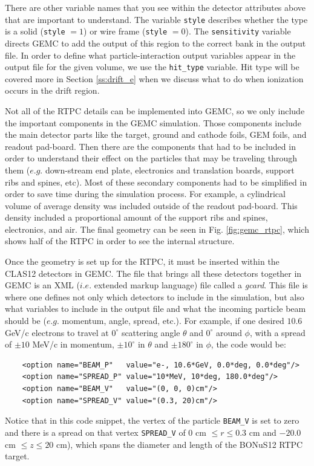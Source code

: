 There are other variable names that you see within the detector attributes above that are important to understand. The variable \lstinline|style| describes whether the type is a solid (\lstinline|style| $= 1$) or wire frame (\lstinline|style| $= 0$). The \lstinline|sensitivity| variable directs GEMC to add the output of this region to the correct bank in the output file. In order to define what particle-interaction output variables appear in the output file for the given volume, we use the \lstinline|hit_type| variable. Hit type will be covered more in Section \ref{ss:drift_e} when we discuss what to do when ionization occurs in the drift region.

Not all of the RTPC details can be implemented into GEMC, so we only include the important components in the GEMC simulation. Those components include the main detector parts like the target, ground and cathode foils, GEM foils, and readout pad-board. Then there are the components that had to be included in order to understand their effect on the particles that may be traveling through them ($e.g.$ down-stream end plate, electronics and translation boards, support ribs and spines, etc). Most of these secondary components had to be simplified in order to save time during the simulation process. For example, a cylindrical volume of average density was included outside of the readout pad-board. This density included a proportional amount of the support ribs and spines, electronics, and air. The final geometry can be seen in Fig. \ref{fig:gemc_rtpc}, which shows half of the RTPC in order to see the internal structure. 

Once the geometry is set up for the RTPC, it must be inserted within the CLAS12 detectors in GEMC. The file that brings all these detectors together in GEMC is an XML ($i.e.$ extended markup language) file called a \textit{gcard}. This file is where one defines not only which detectors to include in the simulation, but also what variables to include in the output file and what the incoming particle beam should be ($e.g.$ momentum, angle, spread, etc.). For example, if one desired $10.6$ GeV/c electrons to travel at $0^{\circ}$ scattering angle $\theta$ and $0^{\circ}$ around $\phi$, with a spread of $\pm 10$ MeV/c in momentum, $\pm 10^{\circ}$ in $\theta$ and $\pm 180^{\circ}$ in $\phi$, the code would be:

\begin{lstlisting}
	<option name="BEAM_P"   value="e-, 10.6*GeV, 0.0*deg, 0.0*deg"/> 
	<option name="SPREAD_P" value="10*MeV, 10*deg, 180.0*deg"/>
	<option name="BEAM_V"   value="(0, 0, 0)cm"/>
	<option name="SPREAD_V" value="(0.3, 20)cm"/>
\end{lstlisting}
Notice that in this code snippet, the vertex of the particle \lstinline|BEAM_V| is set to zero and there is a spread on that vertex \lstinline|SPREAD_V| of $0$ cm $\leq r \leq 0.3$ cm and $-20.0$ cm $\leq z \leq 20$ cm), which spans the diameter and length of the BONuS12 RTPC target.

